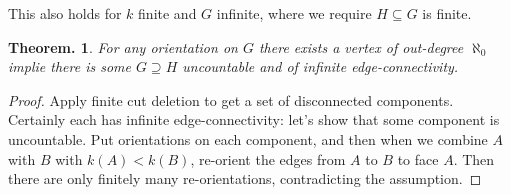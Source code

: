 \documentclass[11pt, a4paper]{memoir}
\theoremstyle{change}
\newtheorem{theorem}{Theorem.}[section]
\theoremstyle{plain}
\theoremstyle{nonumberplain}
\newtheorem{proof}{Proof}
\numberwithin{equation}{section}
\begin{document}
This also holds for $k$ finite and $G$ infinite, where we require $H\subseteq G$ is finite.
\begin{theorem}
    For any orientation on $G$ there exists a vertex of out-degree $\aleph_0$ implie there is some $G\supseteq H$ uncountable and of infinite edge-connectivity.
\end{theorem}
\begin{proof}
    Apply finite cut deletion to get a set of disconnected components.
    Certainly each has infinite edge-connectivity: let's show that some component is uncountable.
    Put orientations on each component, and then when we combine $A$ with $B$ with $k(A)<k(B)$, re-orient the edges from $A$ to $B$ to face $A$.
    Then there are only finitely many re-orientations, contradicting the assumption.
\end{proof}
\end{document}
